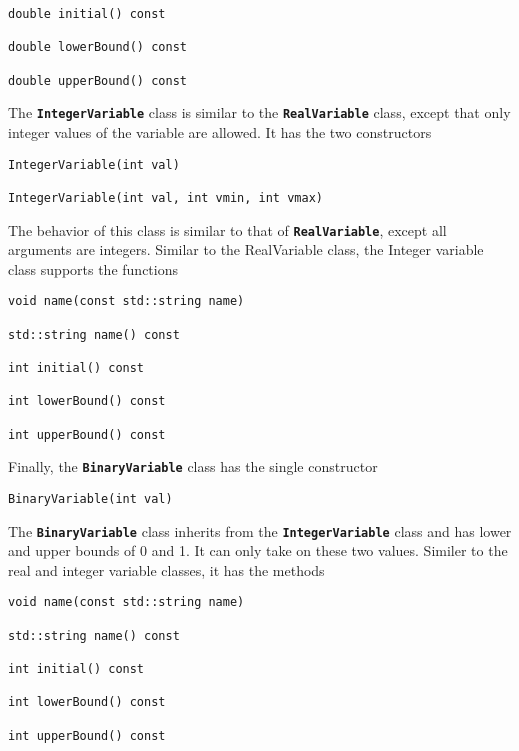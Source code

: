 {
\color{red}
\begin{Verbatim}[fontseries=b]
double initial() const

double lowerBound() const

double upperBound() const
\end{Verbatim}
}

The \texttt{\textbf{IntegerVariable}} class is similar to the \texttt{\textbf{RealVariable}} class, except that only integer values of the variable are allowed. It has the two constructors

{
\color{red}
\begin{Verbatim}[fontseries=b]
IntegerVariable(int val)

IntegerVariable(int val, int vmin, int vmax)
\end{Verbatim}
}

The behavior of this class is similar to that of \texttt{\textbf{RealVariable}}, except all arguments are integers. Similar to the RealVariable class, the Integer variable class supports the functions

{
\color{red}
\begin{Verbatim}[fontseries=b]
void name(const std::string name)

std::string name() const

int initial() const

int lowerBound() const

int upperBound() const
\end{Verbatim}
}

Finally, the \texttt{\textbf{BinaryVariable}} class has the single constructor

{
\color{red}
\begin{Verbatim}[fontseries=b]
BinaryVariable(int val)
\end{Verbatim}
}

The \texttt{\textbf{BinaryVariable}} class inherits from the \texttt{\textbf{IntegerVariable}} class and has lower and upper bounds of 0 and 1. It can only take on these two values. Similer to the real and integer variable classes, it has the methods

{
\color{red}
\begin{Verbatim}[fontseries=b]
void name(const std::string name)

std::string name() const

int initial() const

int lowerBound() const

int upperBound() const
\end{Verbatim}
}

